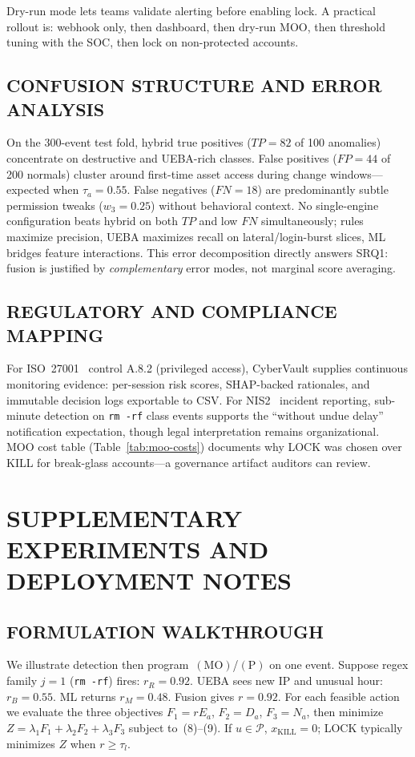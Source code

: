 \documentclass{ieeeaccess}
\begin{document}
Dry-run mode lets teams validate alerting before enabling lock. A practical rollout is: webhook only, then dashboard, then dry-run MOO, then threshold tuning with the SOC, then lock on non-protected accounts.

\subsection{CONFUSION STRUCTURE AND ERROR ANALYSIS}
On the 300-event test fold, hybrid true positives ($TP=82$ of 100 anomalies) concentrate on destructive and UEBA-rich classes. False positives ($FP=44$ of 200 normals) cluster around first-time asset access during change windows---expected when $\tau_a=0.55$. False negatives ($FN=18$) are predominantly subtle permission tweaks ($w_3=0.25$) without behavioral context. No single-engine configuration beats hybrid on both $TP$ and low $FN$ simultaneously; rules maximize precision, UEBA maximizes recall on lateral/login-burst slices, ML bridges feature interactions. This error decomposition directly answers SRQ1: fusion is justified by \textit{complementary} error modes, not marginal score averaging.

\subsection{REGULATORY AND COMPLIANCE MAPPING}
For ISO~27001~\cite{ref28} control A.8.2 (privileged access), CyberVault supplies continuous monitoring evidence: per-session risk scores, SHAP-backed rationales, and immutable decision logs exportable to CSV. For NIS2~\cite{ref29} incident reporting, sub-minute detection on \texttt{rm -rf} class events supports the ``without undue delay'' notification expectation, though legal interpretation remains organizational. MOO cost table (Table~\ref{tab:moo-costs}) documents why LOCK was chosen over KILL for break-glass accounts---a governance artifact auditors can review.

\section{SUPPLEMENTARY EXPERIMENTS AND DEPLOYMENT NOTES}
\label{sec:supplementary}

\subsection{FORMULATION WALKTHROUGH}
We illustrate detection then program~$(\mathrm{MO})$/$(\mathrm{P})$ on one event. Suppose regex family $j=1$ (\texttt{rm -rf}) fires: $r_R=0.92$. UEBA sees new IP and unusual hour: $r_B=0.55$. ML returns $r_M=0.48$. Fusion gives $r=0.92$. For each feasible action we evaluate the three objectives $F_1=r E_a$, $F_2=D_a$, $F_3=N_a$, then minimize $Z=\lambda_1 F_1+\lambda_2 F_2+\lambda_3 F_3$ subject to~(8)--(9). If $u\in\mathcal{P}$, $x_{\mathrm{KILL}}=0$; LOCK typically minimizes $Z$ when $r\geq\tau_l$.
\end{document}

